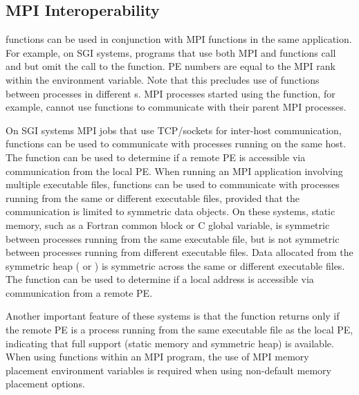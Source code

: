 \subsection{\ac{MPI} Interoperability}
\begin{sloppypar} %
\openshmem functions can be used in conjunction  with  \ac{MPI}
functions  in  the  same  application.   For example, on SGI systems, programs that use both \ac{MPI} and
\openshmem functions call  and  but omit the call
to  the  function.  \openshmem \ac{PE} numbers are equal to the \ac{MPI} rank
within the  environment variable.  Note  that  this  precludes 
use of \openshmem functions between processes in different s. 
\ac{MPI} processes started using the   function,  for
example,  cannot  use  \openshmem functions to communicate with their parent
\ac{MPI} processes.
\end{sloppypar}
On SGI systems \ac{MPI} jobs that use TCP/sockets for inter-host communication, \openshmem functions can be used to communicate with processes running on the same
 host.  The  function can be used to determine if a remote \ac{PE}
 is accessible via \openshmem communication from the local \ac{PE}. When  running  an  \ac{MPI} application involving multiple executable files, \openshmem functions can be used to communicate with processes running  from the same or different executable files, provided that the communication is limited to symmetric data objects.  On these systems, static  memory, such as a Fortran common block or C global variable, is symmetric between processes running from the same executable file,  but
 is  not  symmetric  between processes running from different executable
 files.  Data allocated from the symmetric heap (  or  )
 is  symmetric  across  the same or different executable files. The function 
  can be used to determine  if  a  local  address  is
 accessible via \openshmem communication from a remote \ac{PE}.

 Another important feature of these systems is that the   function returns  only if the remote \ac{PE} is a process running from the same  executable  file  as  the
 local PE, indicating that full \openshmem support (static memory and symmetric heap) is available. When using \openshmem functions within an \ac{MPI} program, the use of 
 \ac{MPI}  memory placement environment variables is required when using non-default memory 
 placement options.
